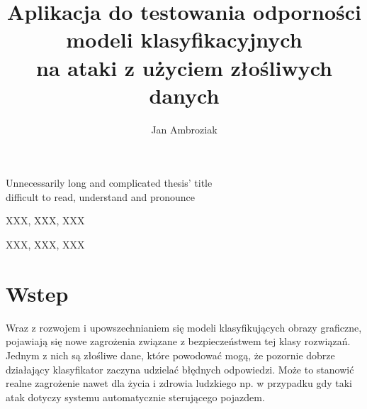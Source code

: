 \documentclass[
    left=2.5cm,         %
    right=2.5cm,        %
    top=2.5cm,          %
    bottom=3cm,         %
    bindingoffset=6mm,  %
    nohyphenation=false %
]{eiti/eiti-thesis}
\begin{document}
\EngineerThesis %
{}
\title
{
    Aplikacja do testowania odporności modeli klasyfikacyjnych \\
    na ataki z użyciem złośliwych danych \\
}

\engtitle
{ %
    Unnecessarily long and complicated thesis' title \\
    difficult to read, understand and pronounce
}

\author{Jan Ambroziak}
\date{\the\year}
\maketitle

\cleardoublepage %
\streszczenie \lipsum[1-3]
\slowakluczowe XXX, XXX, XXX

\newpage
\abstract \kant[1-3]
\keywords XXX, XXX, XXX

\cleardoublepage  %
\pagestyle{plain}
\makeauthorship

\cleardoublepage %
\tableofcontents

\cleardoublepage %
\pagestyle{headings}

\section{Wstep}

Wraz z rozwojem i upowszechnianiem się modeli klasyfikujących obrazy graficzne,
pojawiają się nowe zagrożenia związane z bezpieczeństwem tej klasy rozwiązań.
Jednym z nich są złośliwe dane, które powodować mogą,
że pozornie dobrze działający klasyfikator zaczyna udzielać błędnych odpowiedzi.
Może to stanowić realne zagrożenie nawet dla życia i zdrowia ludzkiego
np. w przypadku gdy taki atak dotyczy systemu automatycznie sterującego pojazdem.
\end{document}
